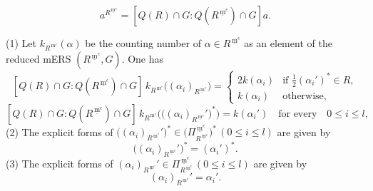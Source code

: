 \documentclass[10pt,a4paper]{amsart}
\newcommand{\mc}{\, \underline{\mathrm{m}}^c}
\begin{document}
\begin{equation}\label{eq:a-Rmc}
a^{R^{\mc}}=[Q(R)\cap G:Q(R^{\mc})\cap G]a.
\end{equation}

\begin{lemma}\label{lemma:Gamma(R'',G)}
{\rm (1)} Let $k_{R^{\mc}}(\alpha)$ be the counting number of 
$\alpha\in R^{\mc}$ as an element of the reduced mERS $(R^{\mc},G)$. One has
\begin{equation}\label{eq:counting-Rmc-1}
[Q(R)\cap G:Q(R^{\mc})\cap G]\,
k_{R^{\mc}}\big((\alpha_i)_{R^{\mc}}\big)=\begin{cases}
2k(\alpha_i) & \text{if $\frac12 (\alpha_i')^\ast\in R$},\\
k(\alpha_i) & \text{otherwise},
\end{cases}
\end{equation}
\begin{equation}\label{eq:counting-Rmc-2}
[Q(R)\cap G:Q(R^{\mc})\cap G]\,
k_{R^{\mc}}\big(\big((\alpha_i)_{R^{\mc}}'\big)^\ast\big)=
k(\alpha_i')\quad\text{for every}\quad 0\leq i\leq l, 
\end{equation}
{\rm (2)} The explicit forms of $\big((\alpha_i)_{R^{\mc}}'\big)^\ast\in 
\big(\Pi^{\mc}_{R^{\mc}}\big)^\ast\, (0\leq i\leq l)$ are given by
\[\big((\alpha_i)_{R^{\mc}}'\big)^\ast=
(\alpha_i')^\ast.\]
{\rm (3)} The explicit forms of 
$(\alpha_i)_{R^{\mc}}'\in \Pi^{\mc}_{R^{\mc}}\, (0\leq i\leq l)$ 
are given by
\[(\alpha_i)_{R^{\mc}}'=\alpha_i'.\]
\end{lemma}
\end{document}
